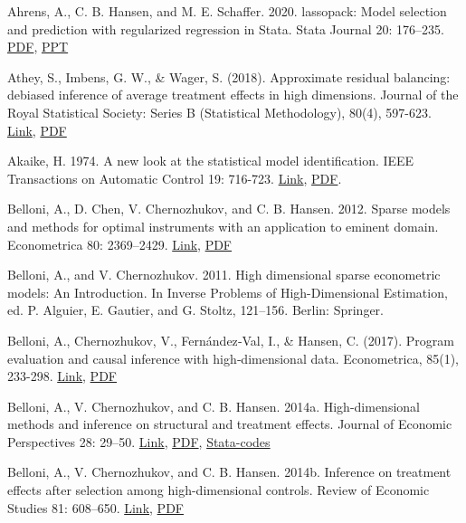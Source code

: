 {Ahrens, A., C. B. Hansen, and M. E. Schaffer. 2020. lassopack: Model selection and prediction with regularized regression in Stata. Stata Journal 20: 176–235. \href{http://sci-hub.ren/10.1177/1536867X20909697}{PDF}, \href{https://statalasso.github.io/pdf/StataConference2018_AhrensSchaffer.pdf}{PPT}

Athey, S., Imbens, G. W., \& Wager, S. (2018). Approximate residual balancing: debiased inference of average treatment effects in high dimensions. Journal of the Royal Statistical Society: Series B (Statistical Methodology), 80(4), 597-623. \href{https://doi.org/10.1111/rssb.12268}{Link}, \href{http://sci-hub.ren/10.1111/rssb.12268}{PDF}         

Akaike, H. 1974. A new look at the statistical model identification.  IEEE Transactions on Automatic Control 19: 716-723. \href{https://doi.org/10.1109/TAC.1974.1100705}{Link}, \href{http://sci-hub.ren/10.1109/TAC.1974.1100705}{PDF}.

Belloni, A., D. Chen, V. Chernozhukov, and C. B. Hansen. 2012. Sparse models and methods for optimal instruments
with an application to eminent domain. Econometrica 80: 2369–2429. \href{https://doi.org/10.3982/ECTA9626}{Link}, \href{http://sci-hub.ren/10.3982/ECTA9626}{PDF} %

Belloni, A., and V. Chernozhukov. 2011. High dimensional sparse econometric models: An Introduction. In Inverse
Problems of High-Dimensional Estimation, ed. P. Alguier, E. Gautier, and G. Stoltz, 121–156. Berlin: Springer.


Belloni, A., Chernozhukov, V., Fernández‐Val, I., \& Hansen, C. (2017). Program evaluation and causal inference with high‐dimensional data. Econometrica, 85(1), 233-298. \href{https://doi.org/10.3982/ECTA12723}{Link}, \href{http://sci-hub.ren/10.3982/ECTA12723}{PDF}

Belloni, A., V. Chernozhukov, and C. B. Hansen. 2014a. High-dimensional methods and inference on structural and
treatment effects. Journal of Economic Perspectives 28: 29–50. \href{https://doi.org/10.1257/jep.28.2.29}{Link}, \href{http://sci-hub.ren/10.1257/jep.28.2.29}{PDF}, \href{https://academic.oup.com/restud/article/81/2/608/1523757}{Stata-codes}

Belloni, A., V. Chernozhukov, and C. B. Hansen. 2014b. Inference on treatment effects after selection among high-dimensional controls. Review of Economic Studies 81: 608–650. \href{https://doi.org/10.1093/restud/rdt044}{Link}, \href{http://sci-hub.ren/10.1093/restud/rdt044}{PDF}

}
